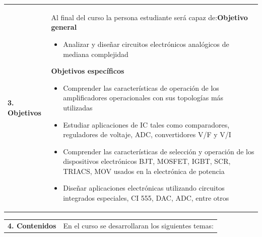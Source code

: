 \documentclass[letterpaper]{article}%
\begin{document}
\vspace*{4mm}%
\newline%
\begin{tabularx}{\textwidth}{p{3cm}p{13cm}}%
\par\fontsize{12}{14}\selectfont \textbf{\textcolor{parte}{3. Objetivos}}&Al final del curso la persona estudiante será capaz de:\newline\newline \textbf{Objetivo general}\begin{itemize}\item Analizar y diseñar circuitos electrónicos analógicos de mediana complejidad\end{itemize} \vspace{2mm}\textbf{Objetivos específicos}\begin{itemize}\item Comprender las características de operación de los amplificadores operacionales con sus topologías más utilizadas\item Estudiar aplicaciones de IC tales como comparadores, reguladores de voltaje, ADC, convertidores V/F y V/I\item Comprender las características de selección y operación de los dispositivos electrónicos BJT, MOSFET, IGBT, SCR, TRIACS, MOV usados en la electrónica de potencia\item Diseñar aplicaciones electrónicas utilizando circuitos integrados especiales, CI 555, DAC, ADC, entre otros\end{itemize}\\%
\end{tabularx}%
\newpage%
\begin{tabularx}{\textwidth}{p{3cm}p{13cm}}%
\par\fontsize{12}{14}\selectfont \textbf{\textcolor{parte}{4. Contenidos}}&En el curso se desarrollaran los siguientes temas:\\%
\end{tabularx}%
\newline%
\end{document}

